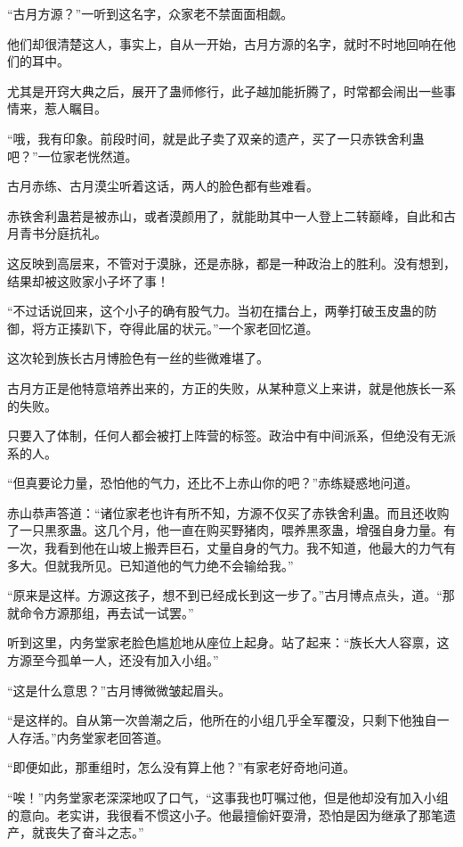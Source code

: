 
\begin{this_body}

“古月方源？”一听到这名字，众家老不禁面面相觑。

他们却很清楚这人，事实上，自从一开始，古月方源的名字，就时不时地回响在他们的耳中。

尤其是开窍大典之后，展开了蛊师修行，此子越加能折腾了，时常都会闹出一些事情来，惹人瞩目。

“哦，我有印象。前段时间，就是此子卖了双亲的遗产，买了一只赤铁舍利蛊吧？”一位家老恍然道。

古月赤练、古月漠尘听着这话，两人的脸色都有些难看。

赤铁舍利蛊若是被赤山，或者漠颜用了，就能助其中一人登上二转巅峰，自此和古月青书分庭抗礼。

这反映到高层来，不管对于漠脉，还是赤脉，都是一种政治上的胜利。没有想到，结果却被这败家小子坏了事！

“不过话说回来，这个小子的确有股气力。当初在擂台上，两拳打破玉皮蛊的防御，将方正揍趴下，夺得此届的状元。”一个家老回忆道。

这次轮到族长古月博脸色有一丝的些微难堪了。

古月方正是他特意培养出来的，方正的失败，从某种意义上来讲，就是他族长一系的失败。

只要入了体制，任何人都会被打上阵营的标签。政治中有中间派系，但绝没有无派系的人。

“但真要论力量，恐怕他的气力，还比不上赤山你的吧？”赤练疑惑地问道。

赤山恭声答道：“诸位家老也许有所不知，方源不仅买了赤铁舍利蛊。而且还收购了一只黒豕蛊。这几个月，他一直在购买野猪肉，喂养黒豕蛊，增强自身力量。有一次，我看到他在山坡上搬弄巨石，丈量自身的气力。我不知道，他最大的力气有多大。但就我所见。已知道他的气力绝不会输给我。”

“原来是这样。方源这孩子，想不到已经成长到这一步了。”古月博点点头，道。“那就命令方源那组，再去试一试罢。”

听到这里，内务堂家老脸色尴尬地从座位上起身。站了起来：“族长大人容禀，这方源至今孤单一人，还没有加入小组。”

“这是什么意思？”古月博微微皱起眉头。

“是这样的。自从第一次兽潮之后，他所在的小组几乎全军覆没，只剩下他独自一人存活。”内务堂家老回答道。

“即便如此，那重组时，怎么没有算上他？”有家老好奇地问道。

“唉！”内务堂家老深深地叹了口气，“这事我也叮嘱过他，但是他却没有加入小组的意向。老实讲，我很看不惯这小子。他最擅偷奸耍滑，恐怕是因为继承了那笔遗产，就丧失了奋斗之志。”


\end{this_body}
